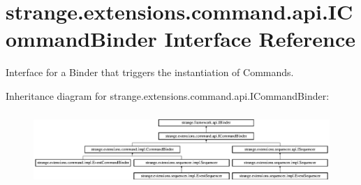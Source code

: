 \hypertarget{interfacestrange_1_1extensions_1_1command_1_1api_1_1_i_command_binder}{\section{strange.\-extensions.\-command.\-api.\-I\-Command\-Binder Interface Reference}
\label{interfacestrange_1_1extensions_1_1command_1_1api_1_1_i_command_binder}
}


Interface for a Binder that triggers the instantiation of Commands.  


Inheritance diagram for strange.\-extensions.\-command.\-api.\-I\-Command\-Binder\-:\begin{figure}[H]
\begin{center}
\leavevmode
\includegraphics[height=2.777778cm]{interfacestrange_1_1extensions_1_1command_1_1api_1_1_i_command_binder}
\end{center}
\end{figure}
